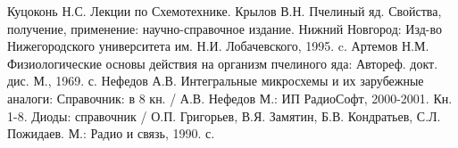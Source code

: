 
\begin{thebibliography}{99}
   	Куцоконь Н.С. Лекции по Схемотехнике.
   	Крылов В.Н. Пчелиный яд. Свойства, получение, применение: научно-справочное издание. Нижний Новгород: Изд-во Нижегородского университета им. Н.И. Лобачевского, 1995.  c.
   	Артемов Н.М. Физиологические основы действия на организм пчелиного яда: Автореф. докт. дис. М., 1969.  с.
   	Нефедов А.В. Интегральные микросхемы и их зарубежные аналоги: Справочник: в 8 кн. / А.В. Нефедов \longndash М.: ИП РадиоСофт, 2000-2001. \longndash Кн. 1-8.
   	Диоды: справочник / О.П. Григорьев, В.Я. Замятин, Б.В. Кондратьев, С.Л. Пожидаев. \longndash М.: Радио и связь, 1990.  с.
\end{thebibliography}
